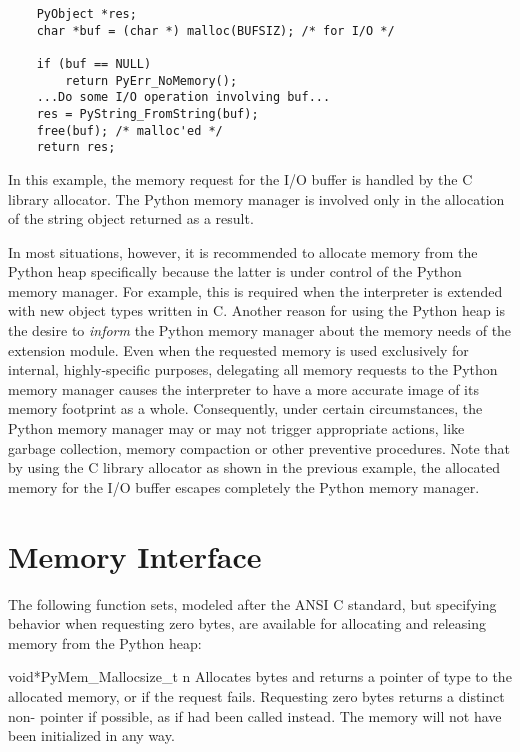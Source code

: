 \begin{verbatim}
    PyObject *res;
    char *buf = (char *) malloc(BUFSIZ); /* for I/O */

    if (buf == NULL)
        return PyErr_NoMemory();
    ...Do some I/O operation involving buf...
    res = PyString_FromString(buf);
    free(buf); /* malloc'ed */
    return res;
\end{verbatim}

In this example, the memory request for the I/O buffer is handled by
the C library allocator. The Python memory manager is involved only
in the allocation of the string object returned as a result.

In most situations, however, it is recommended to allocate memory from
the Python heap specifically because the latter is under control of
the Python memory manager. For example, this is required when the
interpreter is extended with new object types written in C. Another
reason for using the Python heap is the desire to \emph{inform} the
Python memory manager about the memory needs of the extension module.
Even when the requested memory is used exclusively for internal,
highly-specific purposes, delegating all memory requests to the Python
memory manager causes the interpreter to have a more accurate image of
its memory footprint as a whole. Consequently, under certain
circumstances, the Python memory manager may or may not trigger
appropriate actions, like garbage collection, memory compaction or
other preventive procedures. Note that by using the C library
allocator as shown in the previous example, the allocated memory for
the I/O buffer escapes completely the Python memory manager.


\section{Memory Interface \label{memoryInterface}}

The following function sets, modeled after the ANSI C standard,
but specifying  behavior when requesting zero bytes,
are available for allocating and releasing memory from the Python heap:


\begin{cfuncdesc}{void*}{PyMem_Malloc}{size_t n}
  Allocates  bytes and returns a pointer of type 
  to the allocated memory, or \NULL{} if the request fails.
  Requesting zero bytes returns a distinct non-\NULL{} pointer if
  possible, as if  had been called instead.
  The memory will not have been initialized in any way.
\end{cfuncdesc}

